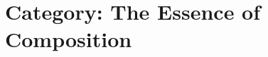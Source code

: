 


% 



\chapter{Category: The Essence of Composition}\label{category-the-essence-of-composition}


% 

% 

% 

% 

% 

